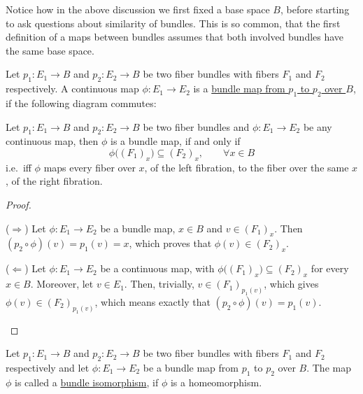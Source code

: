 Notice how in the above discussion we first fixed a base space $B$, before starting to ask questions about similarity of bundles. This is so common, that the first definition of a maps between bundles assumes that both involved bundles have the same base space.
\begin{definition}
Let $p_1:E_1\to B$ and $p_2:E_2\to B$ be two fiber bundles with fibers $F_1$ and $F_2$ respectively. A continuous map $\phi:E_1\to E_2$ is a \ul{bundle map from $p_1$ to $p_2$ over $B$}, if the following diagram commutes:
\begin{center}
\end{center}
\end{definition}

\begin{proposition}
Let $p_1:E_1\to B$ and $p_2:E_2\to B$ be two fiber bundles and $\phi:E_1\to E_2$ be any continuous map, then $\phi$ is a bundle map, if and only if
\[\phi\big({(F_1)}_x\big)\subseteq{(F_2)}_x,\qquad\forall x\in B\]
i.e.\ iff $\phi$ maps every fiber over $x$, of the left fibration, to the fiber over the same $x$, of the right fibration.
\end{proposition}
\begin{proof}
\begin{b_item}
\item[($\Rightarrow$)] Let $\phi:E_1\to E_2$ be a bundle map, $x\in B$ and $v\in {(F_1)}_x$. Then $(p_2\circ\phi)(v)=p_1(v)=x$, which proves that $\phi(v)\in{(F_2)}_x$.
\item[($\Leftarrow$)] Let $\phi:E_1\to E_2$ be a continuous map, with $\phi\big({(F_1)}_x\big)\subseteq{(F_2)}_x$ for every $x\in B$. Moreover, let $v\in E_1$. Then, trivially, $v\in {(F_1)}_{p_1(v)}$, which gives $\phi(v)\in {(F_2)}_{p_1(v)}$, which means exactly that $(p_2\circ\phi)(v)=p_1(v)$.\qedhere
\end{b_item}
\end{proof}

\begin{definition}
Let $p_1:E_1\to B$ and $p_2:E_2\to B$ be two fiber bundles with fibers $F_1$ and $F_2$ respectively and let $\phi:E_1\to E_2$ be a bundle map from $p_1$ to $p_2$ over $B$. The map $\phi$ is called a \ul{bundle isomorphism}, if $\phi$ is a homeomorphism.
\end{definition}

